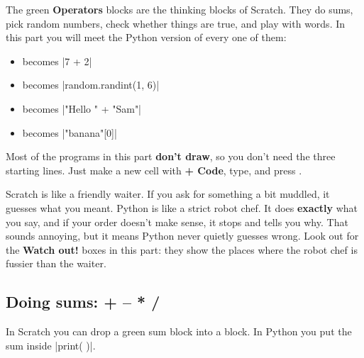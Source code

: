 
The green \textbf{Operators} blocks are the thinking blocks of Scratch. They do sums, pick random numbers, check whether things are true, and play with words. In this part you will meet the Python version of every one of them:

\begin{itemize}
  \item {} becomes \py|7 + 2|
  \item {} becomes \py|random.randint(1, 6)|
  \item {} becomes \py|"Hello " + "Sam"|
  \item {} becomes \py|"banana"[0]|
\end{itemize}

Most of the programs in this part \textbf{don't draw}, so you don't need the three starting lines. Just make a new cell with \textbf{+ Code}, type, and press \playbtn.

\begin{think}
Scratch is like a friendly waiter. If you ask for something a bit muddled, it guesses what you meant. Python is like a strict robot chef. It does \textbf{exactly} what you say, and if your order doesn't make sense, it stops and tells you why. That sounds annoying, but it means Python never quietly guesses wrong. Look out for the \textbf{Watch out!} boxes in this part: they show the places where the robot chef is fussier than the waiter.
\end{think}

\subsection*{Doing sums: + -- * /}

In Scratch you can drop a green sum block into a  block. In Python you put the sum inside \py|print( )|.

